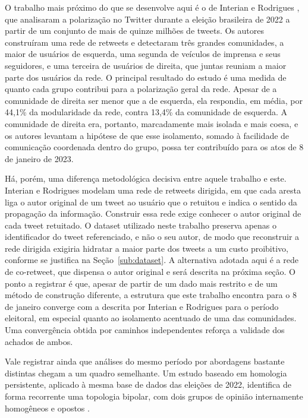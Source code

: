 \documentclass[conference]{IEEEtran}
\begin{document}
O trabalho mais próximo do que se desenvolve aqui é o de Interian e Rodrigues \cite{b_interian2023}, que analisaram a polarização no Twitter durante a eleição brasileira de 2022 a partir de um conjunto de mais de quinze milhões de tweets. Os autores construíram uma rede de retweets e detectaram três grandes comunidades, a maior de usuários de esquerda, uma segunda de veículos de imprensa e seus seguidores, e uma terceira de usuários de direita, que juntas reuniam a maior parte dos usuários da rede. O principal resultado do estudo é uma medida de quanto cada grupo contribui para a polarização geral da rede. Apesar de a comunidade de direita ser menor que a de esquerda, ela respondia, em média, por 44,1\% da modularidade da rede, contra 13,4\% da comunidade de esquerda. A comunidade de direita era, portanto, marcadamente mais isolada e mais coesa, e os autores levantam a hipótese de que esse isolamento, somado à facilidade de comunicação coordenada dentro do grupo, possa ter contribuído para os atos de 8 de janeiro de 2023.

Há, porém, uma diferença metodológica decisiva entre aquele trabalho e este. Interian e Rodrigues modelam uma rede de retweets dirigida, em que cada aresta liga o autor original de um tweet ao usuário que o retuitou e indica o sentido da propagação da informação. Construir essa rede exige conhecer o autor original de cada tweet retuitado. O dataset utilizado neste trabalho preserva apenas o identificador do tweet referenciado, e não o seu autor, de modo que reconstruir a rede dirigida exigiria hidratar a maior parte dos tweets a um custo proibitivo, conforme se justifica na Seção~\ref{sub:dataset}. A alternativa adotada aqui é a rede de co-retweet, que dispensa o autor original e será descrita na próxima seção. O ponto a registrar é que, apesar de partir de um dado mais restrito e de um método de construção diferente, a estrutura que este trabalho encontra para o 8 de janeiro converge com a descrita por Interian e Rodrigues para o período eleitoral, em especial quanto ao isolamento acentuado de uma das comunidades. Uma convergência obtida por caminhos independentes reforça a validade dos achados de ambos.

Vale registrar ainda que análises do mesmo período por abordagens bastante distintas chegam a um quadro semelhante. Um estudo baseado em homologia persistente, aplicado à mesma base de dados das eleições de 2022, identifica de forma recorrente uma topologia bipolar, com dois grupos de opinião internamente homogêneos e opostos \cite{b_rocha2024}.
\end{document}
